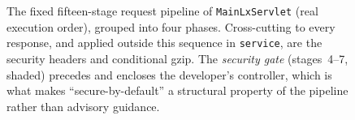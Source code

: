 \begin{figure}[tb]
  \caption{The fixed fifteen-stage request pipeline of \texttt{MainLxServlet}
    (real execution order), grouped into four phases. Cross-cutting to every
    response, and applied outside this sequence in \texttt{service}, are the
    security headers and conditional gzip. The \emph{security gate}
    (stages~4--7, shaded) precedes and encloses the developer's controller,
    which is what makes ``secure-by-default'' a structural property of the
    pipeline rather than advisory guidance.}
  \label{fig:pipeline}
\end{figure}